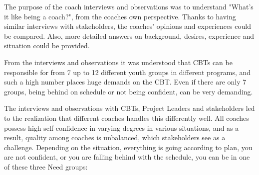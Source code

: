 The purpose of the coach interviews and observations was to understand "What's it like being a coach?", from the coaches own perspective. Thanks to having similar interviews with stakeholders, the coaches' opinions and experiences could be compared. Also, more detailed answers on background, desires, experience and situation could be provided.

 From the interviews and observations it was understood that CBTs can be responsible for from 7 up to 12 different youth groups in different programs, and such a high number places huge demands on the CBT. Even if there are only 7 groups, being behind on schedule or not being confident, can be very demanding.




The interviews and observations with CBTs, Project Leaders and stakeholders led to the realization that different coaches handles this differently well. All coaches possess high self-confidence in varying degrees in various situations, and as a result, quality among coaches is unbalanced, which stakeholders see as a challenge. Depending on the situation, everything is going according to plan, you are not confident, or you are falling behind with the schedule, you can be in one of these three Need groups:

